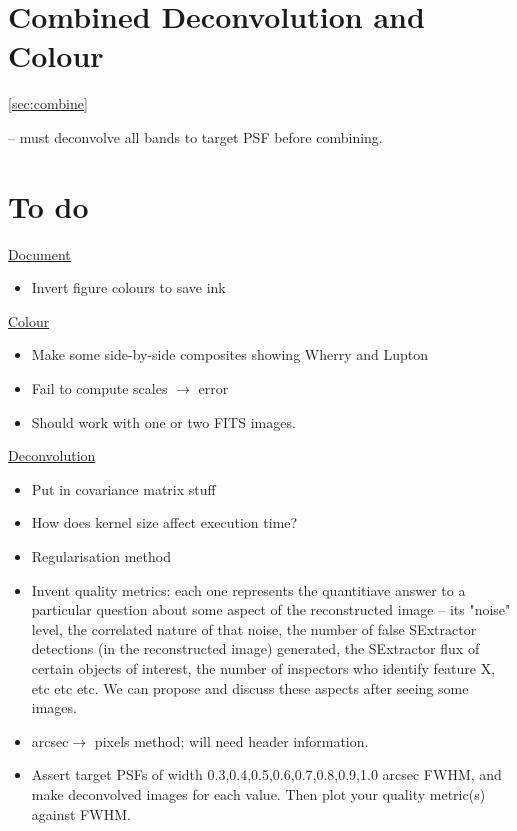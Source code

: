 \documentclass[letterpaper, 11pt]{article}
\def\ra{\ensuremath{\rightarrow}\xspace}
\begin{document}
\section{Combined Deconvolution and Colour}
\ref{sec:combine}

\citet{MCS98} -- must deconvolve all bands to target PSF before combining.


\newpage
\section{To do}

\underline{Document}
\begin{itemize}
	\item Invert figure colours to save ink
\end{itemize}

\underline{Colour}
\begin{itemize}
	\item Make some side-by-side composites showing Wherry and Lupton
	\item Fail to compute scales $\rightarrow$ error
	\item Should work with one or two FITS images.
\end{itemize}

\underline{Deconvolution}
\begin{itemize}
	\item Put in covariance matrix stuff
	\item How does kernel size affect execution time?
	\item Regularisation method
	\item Invent quality metrics: each one represents the quantitiave answer to a particular question about some aspect of the reconstructed image -- its "noise" level, the correlated nature of that noise, the number of false SExtractor detections (in the reconstructed image) generated, the SExtractor flux of certain
objects of interest, the number of inspectors who identify feature X, etc etc etc. We can propose and discuss these aspects after seeing some images.
	\item arcsec\ra pixels method; will need header information.
	\item Assert target PSFs of width 0.3,0.4,0.5,0.6,0.7,0.8,0.9,1.0 arcsec FWHM, and make deconvolved images for each value. Then plot your quality metric(s) against FWHM.
\end{itemize}
\end{document}
